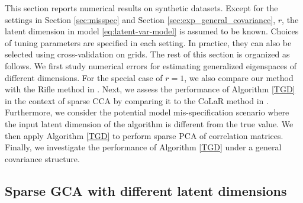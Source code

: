\documentclass[11pt]{article}
\newcommand{\nb}[1]{\textcolor{orange}{\texttt{[#1]}}}
\newcommand{\hs}{s'}
\newcommand{\0}{{\mathbf{0}}}
\begin{document}
This section reports numerical results on synthetic datasets.
Except for the settings in Section \ref{sec:misspec} and Section \ref{sec:exp_general_covariance},
$r$, the latent dimension in model \eqref{eq:latent-var-model} is assumed to be known. 
Choices of tuning parameters are specified in each setting.
In practice,
they can also be selected using cross-validation on grids. %
The rest of this section is organized as follows. 
We first study numerical errors for estimating generalized eigenspaces of different dimensions. 
{For the special case of $r=1$, we also compare our method with the Rifle method in \cite{tan2018sparse}.}
Next, we assess the performance of Algorithm \ref{TGD} in the context of sparse CCA by comparing it to the CoLaR method in \cite{gao2017sparse}. 
Furthermore, we consider the potential model mis-specification scenario where the input latent dimension of the algorithm is different from the true value.
We then apply Algorithm \ref{TGD} to perform sparse PCA of correlation matrices. 
Finally, we investigate the performance of Algorithm \ref{TGD} under a general covariance structure. 

\subsection{Sparse GCA with different latent dimensions}
\label{sec:exp_sparse_gca} 
\end{document}
